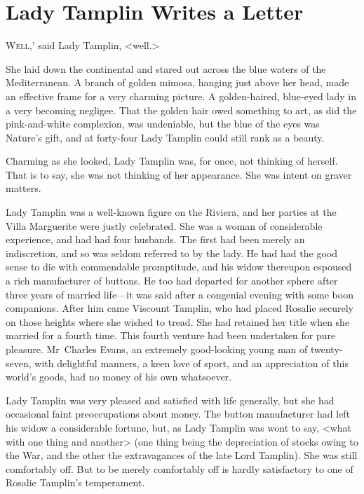 \chapter{Lady Tamplin Writes a Letter}



\lettrine[ante=`]{W}{ell,}' said Lady Tamplin, <well.>

\zz
She laid down the continental  and stared out across the blue waters of the Mediterranean. A branch of golden mimosa, hanging just above her head, made an effective frame for a very charming picture. A golden-haired, blue-eyed lady in a very becoming negligee. That the golden hair owed something to art, as did the pink-and-white complexion, was undeniable, but the blue of the eyes was Nature's gift, and at forty-four Lady Tamplin could still rank as a beauty.

Charming as she looked, Lady Tamplin was, for once, not thinking of herself. That is to say, she was not thinking of her appearance. She was intent on graver matters.

Lady Tamplin was a well-known figure on the Riviera, and her parties at the Villa Marguerite were justly celebrated. She was a woman of considerable experience, and had had four husbands. The first had been merely an indiscretion, and so was seldom referred to by the lady. He had had the good sense to die with commendable promptitude, and his widow thereupon espoused a rich manufacturer of buttons. He too had departed for another sphere after three years of married life—it was said after a congenial evening with some boon companions. After him came Viscount Tamplin, who had placed Rosalie securely on those heights where she wished to tread. She had retained her title when she married for a fourth time. This fourth venture had been undertaken for pure pleasure. Mr~Charles Evans, an extremely good-looking young man of twenty-seven, with delightful manners, a keen love of sport, and an appreciation of this world's goods, had no money of his own whatsoever.

Lady Tamplin was very pleased and satisfied with life generally, but she had occasional faint preoccupations about money. The button manufacturer had left his widow a considerable fortune, but, as Lady Tamplin was wont to say, <what with one thing and another\longdash> (one thing being the depreciation of stocks owing to the War, and the other the extravagances of the late Lord Tamplin). She was still comfortably off. But to be merely comfortably off is hardly satisfactory to one of Rosalie Tamplin's temperament.

